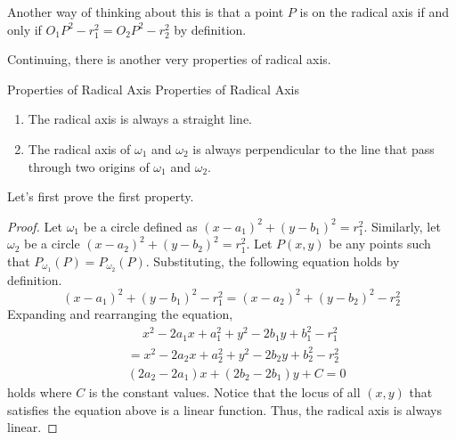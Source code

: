 \documentclass[../../main.tex]{subfiles}
\begin{document}
Another way of thinking about this is that a point $P$ is on the
radical axis if and only if $O_1P^2 - r_1^2 = O_2P^2 - r_2^2$
by definition.

\begin{figure}[H]
\centering
{}
\end{figure}

Continuing, there is another very properties of radical axis.

\begin{theorem}
{Properties of Radical Axis}
{Properties of Radical Axis}
\begin{enumerate}
\item The radical axis is always a straight line.
\item The radical axis of $\omega_1$ and $\omega_2$ is always
perpendicular to the line that pass through two origins of
$\omega_1$ and $\omega_2$.
\end{enumerate}
\end{theorem}

Let's first prove the first property.

\begin{proof}
Let $\omega_1$ be a circle defined as $(x - a_1)^2 + (y - b_1)^2 =
r_1^2$. Similarly, let $\omega_2$ be a circle $(x - a_2)^2 +
(y - b_2)^2 = r_1^2$. Let $P(x, y)$ be any points such that
$P_{\omega_1}(P) = P_{\omega_2}(P)$. Substituting, the following
equation holds by definition.
\[
(x - a_1)^2 + (y - b_1)^2 - r_1^2 = (x - a_2)^2 + (y - b_2)^2 - r_2^2
\]
Expanding and rearranging the equation,
\begin{align*}
    &\quad\ x^2 - 2a_1 x + a_1^2 + y^2 - 2b_1 y + b_1^2 - r_1^2 \\
    &= x^2 - 2a_2 x + a_2^2 + y^2 - 2b_2 y + b_2^2 - r_2^2 \\
    &(2a_2 - 2a_1) x + (2b_2 - 2b_1) y + C = 0
\end{align*}
holds where $C$ is the constant values. Notice that the locus of
all $(x, y)$ that satisfies the equation above is a linear function.
Thus, the radical axis is always linear.
\end{proof}
\end{document}
